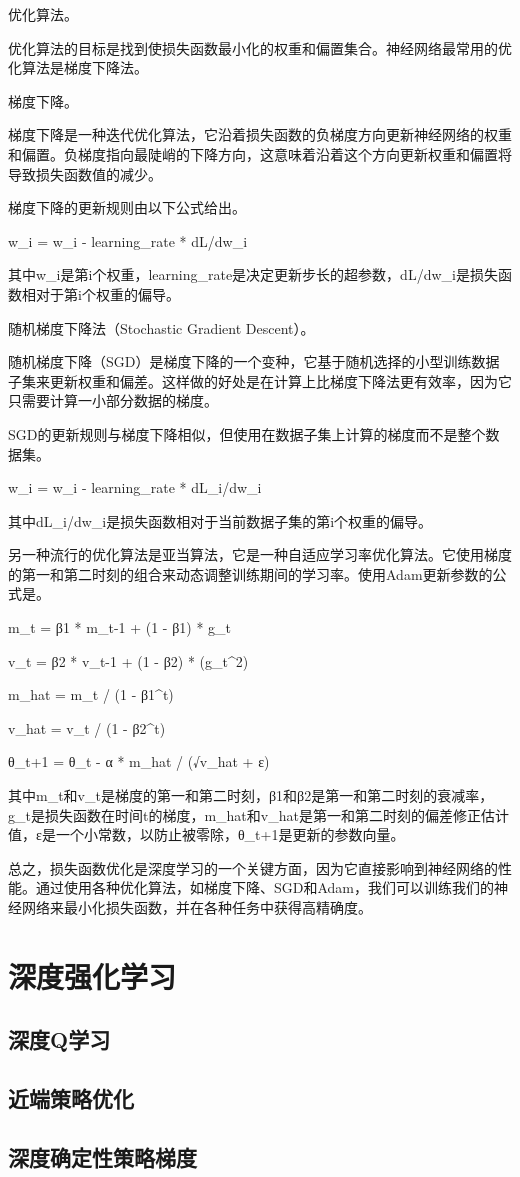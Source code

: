 优化算法。

优化算法的目标是找到使损失函数最小化的权重和偏置集合。神经网络最常用的优化算法是梯度下降法。

梯度下降。

梯度下降是一种迭代优化算法，它沿着损失函数的负梯度方向更新神经网络的权重和偏置。负梯度指向最陡峭的下降方向，这意味着沿着这个方向更新权重和偏置将导致损失函数值的减少。

梯度下降的更新规则由以下公式给出。

w_i = w_i - learning_rate * dL/dw_i

其中w_i是第i个权重，learning_rate是决定更新步长的超参数，dL/dw_i是损失函数相对于第i个权重的偏导。

随机梯度下降法（Stochastic Gradient Descent）。

随机梯度下降（SGD）是梯度下降的一个变种，它基于随机选择的小型训练数据子集来更新权重和偏差。这样做的好处是在计算上比梯度下降法更有效率，因为它只需要计算一小部分数据的梯度。

SGD的更新规则与梯度下降相似，但使用在数据子集上计算的梯度而不是整个数据集。

w_i = w_i - learning_rate * dL_i/dw_i

其中dL_i/dw_i是损失函数相对于当前数据子集的第i个权重的偏导。


另一种流行的优化算法是亚当算法，它是一种自适应学习率优化算法。它使用梯度的第一和第二时刻的组合来动态调整训练期间的学习率。使用Adam更新参数的公式是。

m_t = β1 * m_t-1 + (1 - β1) * g_t

v_t = β2 * v_t-1 + (1 - β2) * (g_t^2)

m_hat = m_t / (1 - β1^t)

v_hat = v_t / (1 - β2^t)

θ_t+1 = θ_t - α * m_hat / (√v_hat + ε)

其中m_t和v_t是梯度的第一和第二时刻，β1和β2是第一和第二时刻的衰减率，g_t是损失函数在时间t的梯度，m_hat和v_hat是第一和第二时刻的偏差修正估计值，ε是一个小常数，以防止被零除，θ_t+1是更新的参数向量。

总之，损失函数优化是深度学习的一个关键方面，因为它直接影响到神经网络的性能。通过使用各种优化算法，如梯度下降、SGD和Adam，我们可以训练我们的神经网络来最小化损失函数，并在各种任务中获得高精确度。


\section{深度强化学习}

\subsection{深度Q学习}

\subsection{近端策略优化}

\subsection{深度确定性策略梯度}
